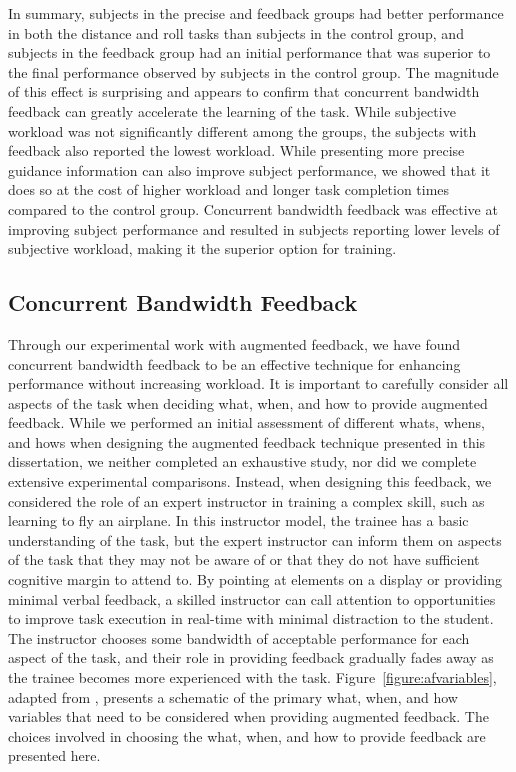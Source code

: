 In summary, subjects in the precise and feedback groups had better performance in both the distance and roll tasks than subjects in the control group, and subjects in the feedback group had an initial performance that was superior to the final performance observed by subjects in the control group.
The magnitude of this effect is surprising and appears to confirm that concurrent bandwidth feedback can greatly accelerate the learning of the task.
While subjective workload was not significantly different among the groups, the subjects with feedback also reported the lowest workload.
While presenting more precise guidance information can also improve subject performance, we showed that it does so at the cost of higher workload and longer task completion times compared to the control group.
Concurrent bandwidth feedback was effective at improving subject performance and resulted in subjects reporting lower levels of subjective workload, making it the superior option for training.

\subsection{Concurrent Bandwidth Feedback} \label{section:cbf}

Through our experimental work with augmented feedback, we have found concurrent bandwidth feedback to be an effective technique for enhancing performance without increasing workload.
It is important to carefully consider all aspects of the task when deciding what, when, and how to provide augmented feedback.
While we performed an initial assessment of different whats, whens, and hows when designing the augmented feedback technique presented in this dissertation, we neither completed an exhaustive study, nor did we complete extensive experimental comparisons.
Instead, when designing this feedback, we considered the role of an expert instructor in training a complex skill, such as learning to fly an airplane.
In this instructor model, the trainee has a basic understanding of the task, but the expert instructor can inform them on aspects of the task that they may not be aware of or that they do not have sufficient cognitive margin to attend to.
By pointing at elements on a display or providing minimal verbal feedback, a skilled instructor can call attention to opportunities to improve task execution in real-time with minimal distraction to the student.
The instructor chooses some bandwidth of acceptable performance for each aspect of the task, and their role in providing feedback gradually fades away as the trainee becomes more experienced with the task.
Figure~\ref{figure:afvariables}, adapted from \citeauthor{hodges2020skill}, presents a schematic of the primary what, when, and how variables that need to be considered when providing augmented feedback.
The choices involved in choosing the what, when, and how to provide feedback are presented here.

